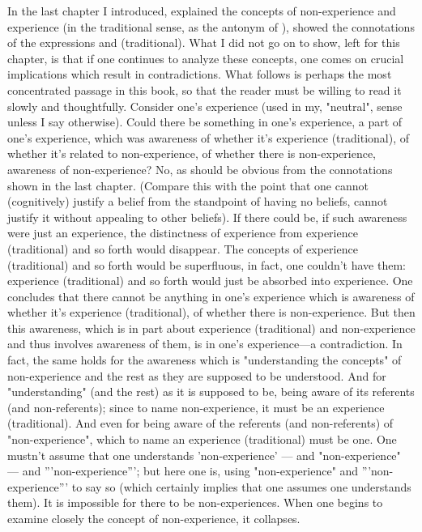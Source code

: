 \documentclass[10pt,twoside]{memoir}
\newcommand{\triquote}[1]{'''#1'''}
\begin{document}
\begin{enumerate}
{In the last chapter I introduced, explained the concepts of 
non-experience and experience (in the traditional sense, as the antonym of 
), showed the connotations of the expressions 
 and  (traditional). What I did not go on to 
show, left for this chapter, is that if one continues to analyze these concepts, 
one comes on crucial implications which result in contradictions. What 
follows is perhaps the most concentrated passage in this book, so that the 
reader must be willing to read it slowly and thoughtfully. Consider one's 
experience (used in my, "neutral", sense unless I say otherwise). Could there 
be something in one's experience, a part of one's experience, which was 
awareness of whether it's experience (traditional), of whether it's related to 
non-experience, of whether there is non-experience, awareness of 
non-experience? No, as should be obvious from the connotations shown in 
the last chapter. (Compare this with the point that one cannot (cognitively) 
justify a belief from the standpoint of having no beliefs, cannot justify it 
without appealing to other beliefs). If there could be, if such awareness were 
just an experience, the distinctness of experience from experience 
(traditional) and so forth would disappear. The concepts of experience 
(traditional) and so forth would be superfluous, in fact, one couldn't have 
them: experience (traditional) and so forth would just be absorbed into 
experience. One concludes that there cannot be anything in one's experience 
which is awareness of whether it's experience (traditional), of whether there 
is non-experience. But then this awareness, which is in part about experience 
(traditional) and non-experience and thus involves awareness of them, is in 
one's experience---a contradiction. In fact, the same holds for the awareness 
which is "understanding the concepts" of non-experience and the rest as 
they are supposed to be understood. And for "understanding"
 (and the rest) as it is supposed to be, being aware of its 
referents (and non-referents); since to name non-experience, it must be an 
experience (traditional). And even for being aware of the referents (and 
non-referents) of "non-experience", which to name an experience 
(traditional) must be one. One mustn't assume that one understands 
'non-experience' --- and "non-experience" --- and \triquote{non-experience}; but here 
one is, using "non-experience" and \triquote{non-experience} to say so (which 
certainly implies that one assumes one understands them). It is impossible 
for there to be non-experiences. When one begins to examine closely the 
concept of non-experience, it collapses. 

}
\end{enumerate}
\end{document}
